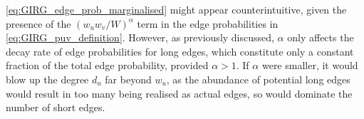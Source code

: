 \cref{eq:GIRG_edge_prob_marginalised} might appear counterintuitive, given the presence of the $(w_u w_v / W)^\alpha$ term in the edge probabilities in \cref{eq:GIRG_puv_definition}. However, as previously discussed, $\alpha$ only affects the decay rate of edge probabilities for long edges, which constitute only a constant fraction of the total edge probability, provided $\alpha > 1$. If $\alpha$ were smaller, it would blow up the degree $d_u$ far beyond $w_u$, as the abundance of potential long edges would result in too many being realised as actual edges, so would dominate the number of short edges.








